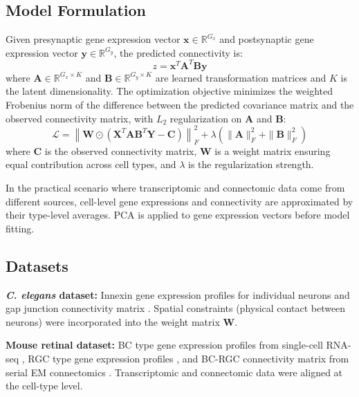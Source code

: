 \documentclass[11pt]{article}
\begin{document}
\subsection{Model Formulation}

Given presynaptic gene expression vector $\mathbf{x} \in \mathbb{R}^{G_x}$ and postsynaptic gene expression vector $\mathbf{y} \in \mathbb{R}^{G_y}$, the predicted connectivity is:
\begin{equation}
z = \mathbf{x}^T \mathbf{A}^T \mathbf{B} \mathbf{y}
\end{equation}
where $\mathbf{A} \in \mathbb{R}^{G_x \times K}$ and $\mathbf{B} \in \mathbb{R}^{G_y \times K}$ are learned transformation matrices and $K$ is the latent dimensionality. The optimization objective minimizes the weighted Frobenius norm of the difference between the predicted covariance matrix and the observed connectivity matrix, with $L_2$ regularization on $\mathbf{A}$ and $\mathbf{B}$:
\begin{equation}
\mathcal{L} = \left\| \mathbf{W} \odot \left( \mathbf{X}^T \mathbf{A} \mathbf{B}^T \mathbf{Y} - \mathbf{C} \right) \right\|_F^2 + \lambda \left( \|\mathbf{A}\|_F^2 + \|\mathbf{B}\|_F^2 \right)
\end{equation}
where $\mathbf{C}$ is the observed connectivity matrix, $\mathbf{W}$ is a weight matrix ensuring equal contribution across cell types, and $\lambda$ is the regularization strength.

In the practical scenario where transcriptomic and connectomic data come from different sources, cell-level gene expressions and connectivity are approximated by their type-level averages. PCA is applied to gene expression vectors before model fitting.

\subsection{Datasets}

\textbf{\textit{C. elegans} dataset:} Innexin gene expression profiles for individual neurons and gap junction connectivity matrix \citep{varshney2011structural, kovacs2020genetic}. Spatial constraints (physical contact between neurons) were incorporated into the weight matrix $\mathbf{W}$.

\textbf{Mouse retinal dataset:} BC type gene expression profiles from single-cell RNA-seq \citep{shekhar2016comprehensive}, RGC type gene expression profiles \citep{tran2019single}, and BC-RGC connectivity matrix from serial EM connectomics \citep{helmstaedter2013connectomic, bae2018digital}. Transcriptomic and connectomic data were aligned at the cell-type level.
\end{document}
